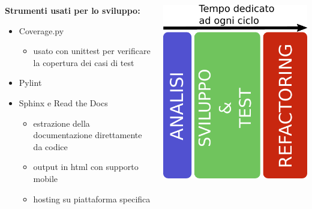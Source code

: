 \documentclass{beamer}
\begin{document}
\begin{frame}{\secname}
\begin{columns}
\begin{column}{0.6\textwidth}
			\textbf{Strumenti usati per lo sviluppo:}
			\begin{itemize}
				\item Coverage.py
					\begin{itemize}
						\item usato con unittest per verificare la copertura dei casi di test
					\end{itemize}
				\item Pylint
				\item Sphinx e Read the Docs
					\begin{itemize}
						\item estrazione della documentazione direttamente da codice
						\item output in html con supporto mobile
						\item hosting su piattaforma specifica
					\end{itemize}
			\end{itemize}
		\end{column}
		\begin{column}{0.4\textwidth}
			\begin{flushright}
				\includegraphics[scale=0.55]{timebox}
			\end{flushright}
		\end{column}
	\end{columns}
\end{frame}
\end{document}

